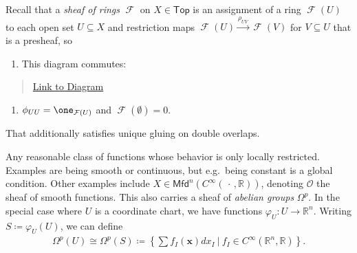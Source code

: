 \begin{remark}

Recall that a \emph{sheaf of rings} \(\operatorname{\mathcal{F}}\) on
\(X\in {\mathsf{Top}}\) is an assignment of a ring
\(\operatorname{\mathcal{F}}(U)\) to each open set \(U\subseteq X\) and
restriction maps
\(\operatorname{\mathcal{F}}(U) \xrightarrow{\rho_{UV}} \operatorname{\mathcal{F}}(V)\)
for \(V \subseteq U\) that is a presheaf, so

\begin{enumerate}
\def\labelenumi{\arabic{enumi}.}
\tightlist
\item
  This diagram commutes:
\end{enumerate}

\begin{center}
\end{center}

\begin{quote}
\href{https://q.uiver.app/?q=WzAsMyxbMCwwLCJVIl0sWzIsMCwiViJdLFs0LDAsIlciXSxbMCwxLCJcXHJob197VVZ9Il0sWzEsMiwiXFxyaG9fe1ZXfSJdLFswLDIsIlxccmhvX3tVV30iLDIseyJjdXJ2ZSI6NX1dXQ==}{Link
to Diagram}
\end{quote}

\begin{enumerate}
\def\labelenumi{\arabic{enumi}.}
\setcounter{enumi}{1}
\tightlist
\item
  \(\phi_{UU} = \one_{\operatorname{\mathcal{F}}(U)}\) and
  \(\operatorname{\mathcal{F}}(\emptyset) = 0\).
\end{enumerate}

That additionally satisfies unique gluing on double overlaps.

\end{remark}

\begin{example}[?]

Any reasonable class of functions whose behavior is only locally
restricted. Examples are being smooth or continuous, but e.g.~being
constant is a global condition. Other examples include
\(X\in {\mathsf{Mfd}}^n(C^\infty({\,\cdot\,}, {\mathbb{R}}))\), denoting
\({\mathcal{O}}\) the sheaf of smooth functions. This also carries a
sheaf of \emph{abelian groups} \(\Omega^p\). In the special case where
\(U\) is a coordinate chart, we have functions
\(\varphi_U: U\to {\mathbb{R}}^n\). Writing \(S \coloneqq\varphi_U(U)\),
we can define
\begin{align*} 
\Omega^p(U) \cong \Omega^p(S) \coloneqq\left\{{ \sum f_I(\mathbf{x}) dx_I {~\mathrel{\Big|}~}f_I \in C^\infty({\mathbb{R}}^n, {\mathbb{R}})}\right\}
.\end{align*}

\end{example}

